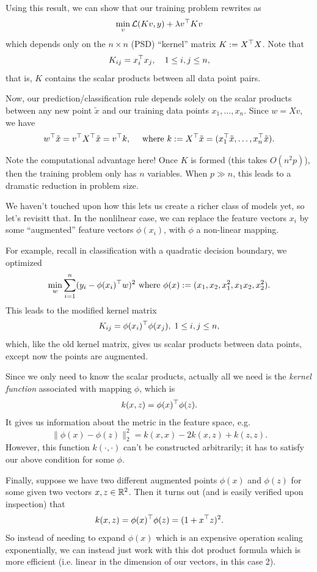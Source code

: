 \documentclass[11 pt]{scrartcl}
\newcommand{\tx}{\tilde{x}}
\begin{document}
Using this result, we can show that our training problem rewrites as 
\[ \min_v \mathcal L(Kv, y) + \lambda v^\top K v\]
which depends only on the $n\times n$ (PSD) ``kernel'' matrix $K := X^\top X$. 
Note that 
\[ K_{ij} = x_i^\top x_j, \quad 1\leq i,j\leq n,\] 
that is, $K$ contains the scalar products between all data point pairs. 

Now, our prediction/classification rule depends solely on the scalar products between any new point $\tilde{x}$ and our training data points $x_1, \dots, x_n$. 
Since $w = Xv$, we have
\[ w^\T \tilde{x} = v^\T X^\T \tilde{x} = v^\T k, \quad \text{ where } k := X^\T \tilde{x} = (x_1^\T \tilde{x},\dots, x_n^\T \tx).\]

Note the computational advantage here! 
Once $K$ is formed (this takes $O(n^2p)$), then the training problem only has $n$ variables. 
When $p \gg n$, this leads to a dramatic reduction in problem size.

We haven't touched upon how this lets us create a richer class of models yet, so let's revisitt that. 
In the nonlilnear case, we can replace the feature vectors $x_i$ by some ``augmented'' feature vectors $\phi(x_i)$, with $\phi$ a non-linear mapping. 

For example, recall in classification with a quadratic decision boundary, we optimized 
\[ \min_w \sum_{i=1}^n (y_i - \phi(x_i)^\top w)^2 \text{  where  } \phi(x) := (x_1, x_2, x_1^2, x_1x_2, x_2^2). \]
This leads to the modified kernel matrix 
\[ K_{ij} = \phi(x_i)^\top \phi(x_j), \; 1\leq i,j\leq n,\]
which, like the old kernel matrix, gives us scalar products between data points, except now the points are augmented. 

Since we only need to know the scalar products, actually all we need is the \emph{kernel function} associated with mapping $\phi$, which is 
\[ k(x,z) = \phi(x)^\top \phi(z).\] 
It gives us information about the metric in the feature space, e.g. 
\[ \| \phi(x) - \phi(z) \|^2_2 = k(x,x) - 2k(x,z) + k(z,z).\] 
However, this function $k(\cdot, \cdot)$ can't be constructed arbitrarily; it has to satisfy our above condition for some $\phi$. 

Finally, suppose we have two different augmented points $\phi(x)$ and $\phi(z)$ for some given two vectors $x,z\in\mathbb R^2$.
Then it turns out (and is easily verified upon inspection) that  
\[ k(x,z) = \phi(x)^\top \phi(z) = (1 + x^\top z)^2.\] 
So instead of needing to expand $\phi(x)$ which is an expensive operation scaling exponentially, we can instead just work with this dot product formula which is more efficient (i.e. linear in the dimension of our vectors, in this case 2).  
\end{document}

